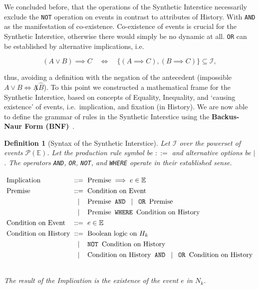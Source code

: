 \documentclass[11pt, a4paper]{article}
\theoremstyle{formalism}
\newtheorem{formalism}{Definition}
\begin{document}
We concluded before, that the operations of the Synthetic Interstice
necessarily exclude the {\tt NOT} operation on events in contrast to attributes
of History. With {\tt AND} as the manifestation of co-existence. Co-existence
of events is crucial for the Synthetic Interstice, otherwise there would simply
be no dynamic at all. {\tt OR} can be established by alternative implications,
i.e.

\begin{equation}
    (A \lor B) \implies C \quad \iff \quad \{ (A \implies C), (B \implies C) \} \subseteq \mathcal{I},
\end{equation}

thus, avoiding a definition with the negation of the antecedent (impossible
$A\lor B \iff \not A \hat B$). To this point we constructed a mathematical
frame for the Synthetic Interstice, based on concepts of Equality, Inequality,
and `causing existence' of events, i.e.\ implication, and fixation (in History).
We are now able to define the grammar of rules in the Synthetic Interstice
using the \textbf{Backus-Naur Form (BNF)}~\cite{Backus1959}.

\begin{formalism}[Syntax of the Synthetic Interstice]

Let $\mathcal{I}$ over the powerset of events $\mathcal{P}(\mathbb{E})$.
Let the production rule symbol be $::=$ and alternative options be $|$. The operators
{\tt AND}, {\tt OR}, {\tt NOT}, and {\tt WHERE} operate in their established sense.

\begin{displaymath}
\renewcommand{\arraystretch}{1.3} %
\setlength{\arraycolsep}{3pt}     %
\begin{array}{l c l}              %
    \text{Implication} & ::= & \text{Premise} \implies e \in \mathbb{E} \\
    \text{Premise}     & ::= & \text{Condition on Event} \\
                       & \mid & \text{Premise} \textnormal{\texttt{ AND }} \mid \textnormal{\texttt{ OR }} \text{Premise} \\
                       & \mid & \text{Premise} \textnormal{\texttt{ WHERE }} \text{Condition on History} \\
    \text{Condition on Event}   & ::= & e \in \mathbb{E} \\
    \text{Condition on History} & ::= & \text{Boolean logic on } H_k \\
                                & \mid & \textnormal{\texttt{NOT }} \text{Condition on History} \\
                                & \mid & \text{Condition on History} \textnormal{\texttt{ AND }} \mid \textnormal{\texttt{ OR }} \text{Condition on History} \\
    & & 
\end{array}
\end{displaymath}
    The result of the {\it Implication\/} is the existence of the event $e$ in $N_k$.
\end{formalism}
\end{document}
